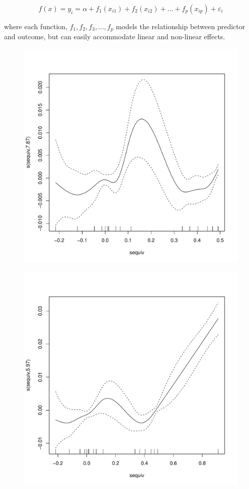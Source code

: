 \documentclass[12pt,letterpaper]{article}
\begin{document}
	\begin{equation*}
	f(x) = y_i = \alpha + f_1(x_{i1}) + f_2(x_{i2}) + ... + f_p(x_{ip}) + \varepsilon_i
	\end{equation*}
	
	where each function, $f_1, f_2, f_3, ..., f_p$ models the relationship between predictor and outcome, but can easily accommodate linear and non-linear effects.
	
	\begin{figure}[ht]
		\centering
		\begin{minipage}{.5\textwidth}
			\centering
			\includegraphics[width = \linewidth]{figures/no_can_gam.pdf}
			\label{fig:test1}
		\end{minipage}%
		\begin{minipage}{.5\textwidth}
			\centering
			\includegraphics[width= \linewidth]{figures/can_gam.pdf}

\end{minipage}
\end{figure}
\end{document}

